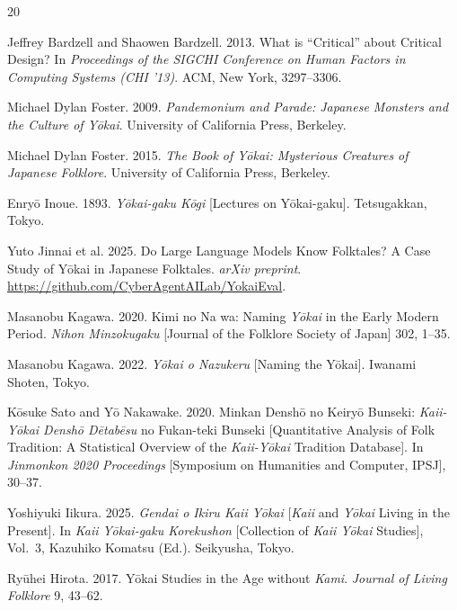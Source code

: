 \documentclass[manuscript,review,anonymous,nonacm]{acmart}
\begin{document}
\begin{thebibliography}{20}

Jeffrey Bardzell and Shaowen Bardzell. 2013.
What is ``Critical'' about Critical Design?
In \textit{Proceedings of the SIGCHI Conference on Human Factors in Computing Systems (CHI '13)}. ACM, New York, 3297--3306.

Michael Dylan Foster. 2009.
\textit{Pandemonium and Parade: Japanese Monsters and the Culture of Y\=okai}.
University of California Press, Berkeley.

Michael Dylan Foster. 2015.
\textit{The Book of Y\=okai: Mysterious Creatures of Japanese Folklore}.
University of California Press, Berkeley.

Enry\=o Inoue. 1893.
\textit{Y\=okai-gaku K\=ogi} [Lectures on Y\=okai-gaku].
Tetsugakkan, Tokyo.

Yuto Jinnai et al. 2025.
Do Large Language Models Know Folktales? A Case Study of Y\=okai in Japanese Folktales.
\textit{arXiv preprint}. \url{https://github.com/CyberAgentAILab/YokaiEval}.

Masanobu Kagawa. 2020.
Kimi no Na wa: Naming \textit{Y\=okai} in the Early Modern Period.
\textit{Nihon Minzokugaku} [Journal of the Folklore Society of Japan] 302, 1--35.

Masanobu Kagawa. 2022.
\textit{Y\=okai o Nazukeru} [Naming the Y\=okai].
Iwanami Shoten, Tokyo.

K\=osuke Sato and Y\=o Nakawake. 2020.
Minkan Densh\=o no Keiry\=o Bunseki: \textit{Kaii-Y\=okai Densh\=o D\=etab\=esu} no Fukan-teki Bunseki [Quantitative Analysis of Folk Tradition: A Statistical Overview of the \textit{Kaii-Y\=okai} Tradition Database].
In \textit{Jinmonkon 2020 Proceedings} [Symposium on Humanities and Computer, IPSJ], 30--37.

Yoshiyuki Iikura. 2025.
\textit{Gendai o Ikiru Kaii Y\=okai} [\textit{Kaii} and \textit{Y\=okai} Living in the Present].
In \textit{Kaii Y\=okai-gaku Korekushon} [Collection of \textit{Kaii Y\=okai} Studies], Vol.~3, Kazuhiko Komatsu (Ed.). Seikyusha, Tokyo.

Ry\=uhei Hirota. 2017.
Y\=okai Studies in the Age without \textit{Kami}.
\textit{Journal of Living Folklore} 9, 43--62.


\end{thebibliography}
\end{document}
